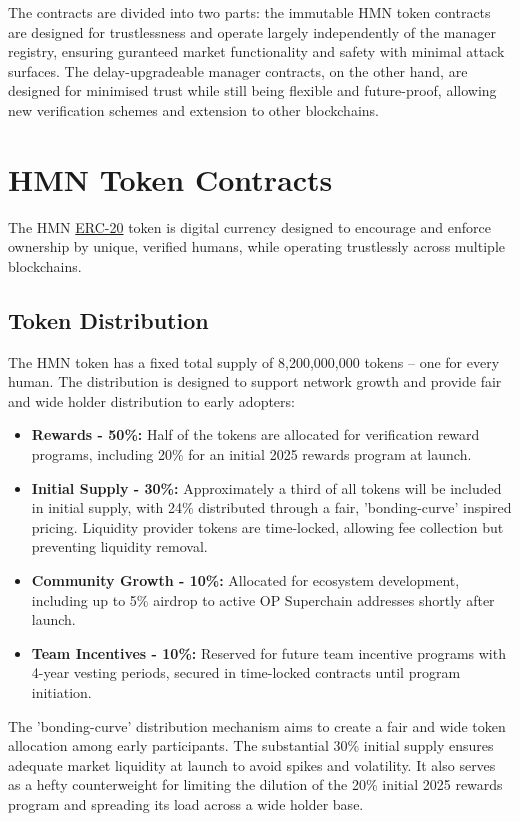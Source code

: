 \documentclass[12pt,a4paper]{article}
\begin{document}
The contracts are divided into two parts: the immutable HMN token contracts are designed for trustlessness and operate largely independently of the manager registry, ensuring guranteed market functionality and safety with minimal attack surfaces.
The delay-upgradeable manager contracts, on the other hand, are designed for minimised trust while still being flexible and future-proof, allowing new verification schemes and extension to other blockchains.

\section{HMN Token Contracts}
The HMN \href{https://ethereum.org/en/developers/docs/standards/tokens/erc-20/}{ERC-20} token is digital currency designed to encourage and enforce ownership by unique, verified humans, while operating trustlessly across multiple blockchains.

\subsection{Token Distribution}
The HMN token has a fixed total supply of 8,200,000,000 tokens -- one for every human. The distribution is designed to support network growth and provide fair and wide holder distribution to early adopters:

\begin{itemize}
    \item \textbf{Rewards - 50\%:} Half of the tokens are allocated for verification reward programs, including 20\% for an initial 2025 rewards program at launch.
    \item \textbf{Initial Supply - 30\%:} Approximately a third of all tokens will be included in initial supply, with 24\% distributed through a fair, 'bonding-curve' inspired pricing. Liquidity provider tokens are time-locked, allowing fee collection but preventing liquidity removal.
    \item \textbf{Community Growth - 10\%:} Allocated for ecosystem development, including up to 5\% airdrop to active OP Superchain addresses shortly after launch.
    \item \textbf{Team Incentives - 10\%:} Reserved for future team incentive programs with 4-year vesting periods, secured in time-locked contracts until program initiation.
\end{itemize}

The 'bonding-curve' distribution mechanism aims to create a fair and wide token allocation among early participants.
The substantial 30\% initial supply ensures adequate market liquidity at launch to avoid spikes and volatility. It also serves as a hefty counterweight for limiting the dilution of the 20\% initial 2025 rewards program and spreading its load across a wide holder base.
\end{document}
